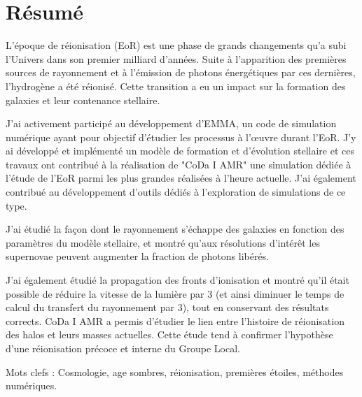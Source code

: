 \begingroup
\let\clearpage\relax
\let\cleardoublepage\relax
\let\cleardoublepage\relax

\chapter*{Résumé}
L’époque de réionisation (EoR) est une phase de grands changements qu’a subi l’Univers dans son premier milliard d’années. 
Suite à l’apparition des premières sources de rayonnement et à l’émission de photons énergétiques par ces dernières, l’hydrogène a été réionisé. 
Cette transition a eu un impact sur la formation des galaxies et leur contenance stellaire.

J’ai activement participé au développement d’EMMA, un code de simulation numérique ayant pour objectif d’étudier les processus à l’œuvre durant l’EoR. 
J’y ai développé et implémenté un modèle de formation et d’évolution stellaire et ces travaux ont contribué à la réalisation de "CoDa I AMR" une simulation dédiée à l’étude de l’EoR parmi les plus grandes réalisées à l’heure actuelle. 
J’ai également contribué au développement d’outils dédiés à l’exploration de simulations de ce type.

J’ai étudié la façon dont le rayonnement s’échappe des galaxies en fonction des paramètres du modèle stellaire, et montré qu'aux résolutions d’intérêt les supernovae peuvent augmenter la fraction de photons libérés.

J’ai également étudié la propagation des fronts d’ionisation et montré qu’il était possible de réduire la vitesse de la lumière par 3 (et ainsi diminuer le temps de calcul du transfert du rayonnement par 3), tout en conservant des résultats corrects.
CoDa I AMR a permis d'étudier le lien entre l'histoire de réionisation des halos et leurs masses actuelles.
Cette étude tend à confirmer l'hypothèse d'une réionisation précoce et interne du Groupe Local.


\vspace{0.5cm}

Mots clefs : Cosmologie, age sombres, réionisation, premières étoiles, méthodes numériques.
\vfill

\newpage

